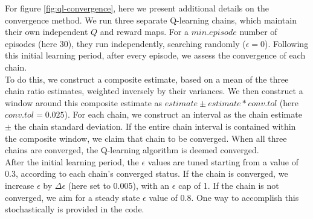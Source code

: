 For figure \ref{fig:ql-convergence}, here we present additional details on the convergence method.
We run three separate Q-learning chains, which maintain their own independent $Q$ and reward maps. 
For a $min.episode$ number of episodes (here 30), they run independently, searching randomly ($\epsilon=0$).
Following this initial learning period, after every episode, we assess the convergence of each chain. \\
To do this, we construct a composite estimate, based on a mean of the three chain ratio estimates, weighted inversely by their variances.
We then construct a window around this composite estimate as $estimate \pm estimate*conv.tol$ (here $conv.tol=0.025$).
For each chain, we construct an interval as the chain estimate $\pm$ the chain standard deviation.
If the entire chain interval is contained within the composite window, we claim that chain to be converged.
When all three chains are converged, the Q-learning algorithm is deemed converged. \\
After the initial learning period, the $\epsilon$ values are tuned starting from a value of 0.3, according to each chain's converged status.
If the chain is converged, we increase $\epsilon$ by $\Delta \epsilon$ (here set to 0.005), with an $\epsilon$ cap of 1.
If the chain is not converged, we aim for a steady state $\epsilon$ value of 0.8.
One way to accomplish this stochastically is provided in the code.

